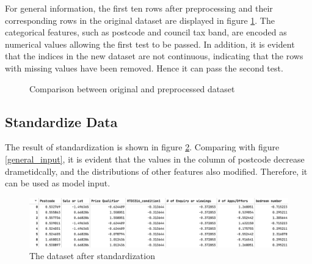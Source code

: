 \documentclass[12pt,twoside]{report}
\begin{document}
For general information, the first ten rows after preprocessing and their corresponding rows in the original dataset are displayed in figure \ref{general_info}. The categorical features, such as postcode and council tax band, are encoded as numerical values allowing the first test to be passed. In addition, it is evident that the indices in the new dataset are not continuous, indicating that the rows with missing values have been removed. Hence it can pass the second test. 

\begin{figure}[!htbp]
	\centering
	\caption{Comparison  between original and preprocessed dataset}
	\label{general_info}
\end{figure}

\subsection{Standardize Data}
The result of standardization is shown in figure \ref{preprocessed_dataset}. Comparing with figure \ref{general_input}, it is evident that the values in the column of postcode decrease drametidcally, and the distributions of other features also modified. Therefore, it can be used as model input.

\begin{figure}[!htbp]
	\centering
	\includegraphics[width=\linewidth]{normalized}
	\caption{The dataset after standardization}
	\label{preprocessed_dataset}
\end{figure}
\end{document}

